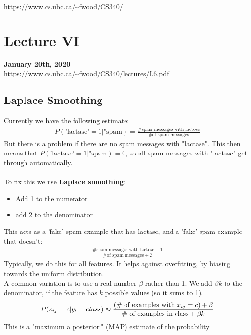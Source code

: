 \documentclass{article}
\theoremstyle{definition}
\begin{document}
\noindent \url{https://www.cs.ubc.ca/~fwood/CS340/}

\section*{Lecture VI}
\textbf{January 20th, 2020}\\
\noindent \url{https://www.cs.ubc.ca/~fwood/CS340/lectures/L6.pdf}

\subsection*{Laplace Smoothing}
Currently we have the following estimate:
\begin{align*}
	P(\text{'lactase'} = 1 | \text{"spam}) = \frac{\text{\# spam messages with lactose}}{\text{\# of spam messages}}
\end{align*}
But there is a problem if there are {\color{OliveGreen} no spam messages with "lactase"}. This then means that $ P(\text{'lactase'} = 1 | \text{"spam}) = 0 $, so {\color{red} all spam messages with "lactase" get through automatically. } \\ \\
To fix this we use \textbf{\color{blue} Laplace smoothing}:
\begin{itemize}
	\item Add 1 to the numerator
	\item add 2 to the denominator
\end{itemize}
This acts as a 'fake' spam example that has lactase, and a 'fake' spam example that doesn't:{ \color{blue}
\begin{align*}
\frac{\text{\# spam messages with lactose}+1}{\text{\# of spam messages}+2}
\end{align*}}
Typically, we {\color{OliveGreen} do this for all features}. It helps against overfitting, by biasing towards the uniform distribution. \\
A common variation is to use a {\color{OliveGreen} real number $ \beta $} rather than 1. We {\color{OliveGreen} add $ \beta k $ to the denominator}, if the feature has $ k $ possible values (so it sums to 1). 
\begin{align*}
	P(x_{ij} = c | y_i = class) \approx \frac{\text{(\# of examples with $ x_{ij} = c $)} + \beta}{\text{\# of examples in class} + \beta k}
\end{align*}
This is a {\color{blue} "maximum a posteriori}" (MAP) estimate of the probability
\end{document}
